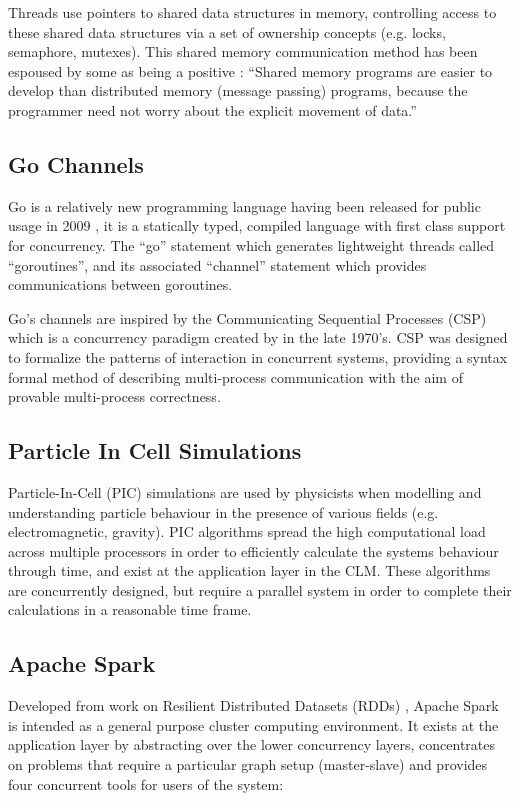 \documentclass{sig-alternate}
\begin{document}
Threads use pointers to shared data structures in memory, controlling access to these shared data structures via a set of ownership concepts (e.g. locks, semaphore, mutexes). This shared memory communication method has been espoused by some as being a positive \cite{john90:_munin}: ``Shared memory programs are easier to develop than distributed memory (message passing) programs, because the programmer need not worry about the explicit movement of data.'' 

\subsection{Go Channels}
Go is a relatively new programming language having been released for public usage in 2009 \cite{go:_frequen_asked_quest}, it is a statically typed, compiled language with first class support for concurrency. The ``go'' statement which generates lightweight threads called ``goroutines'', and its associated ``channel'' statement which provides communications between goroutines.

Go's channels are inspired by the Communicating Sequential Processes (CSP) which is a concurrency paradigm created by \cite{Hoare:1978:CSP:359576.359585} in the late 1970's. CSP was designed to formalize the patterns of interaction in concurrent systems, providing a syntax formal method of describing multi-process communication with the aim of provable multi-process correctness.

\subsection{Particle In Cell Simulations}
Particle-In-Cell (PIC) simulations are used by physicists when modelling and understanding particle behaviour in the presence of various fields (e.g. electromagnetic, gravity). PIC algorithms spread the high computational load across multiple processors in order to efficiently calculate the systems behaviour through time, and exist at the application layer in the CLM. These algorithms are concurrently designed, but require a parallel system in order to complete their calculations in a reasonable time frame. 

\subsection{Apache Spark}
Developed from work on Resilient Distributed Datasets (RDDs)  \cite{zaharia14:_archit_fast_gener_data_proces_large_clust},  Apache Spark is intended as a general purpose cluster computing environment. It exists at the application layer by abstracting over the lower concurrency layers, concentrates on problems that require a particular graph setup (master-slave) and provides four concurrent tools for users of the system:
\end{document}
